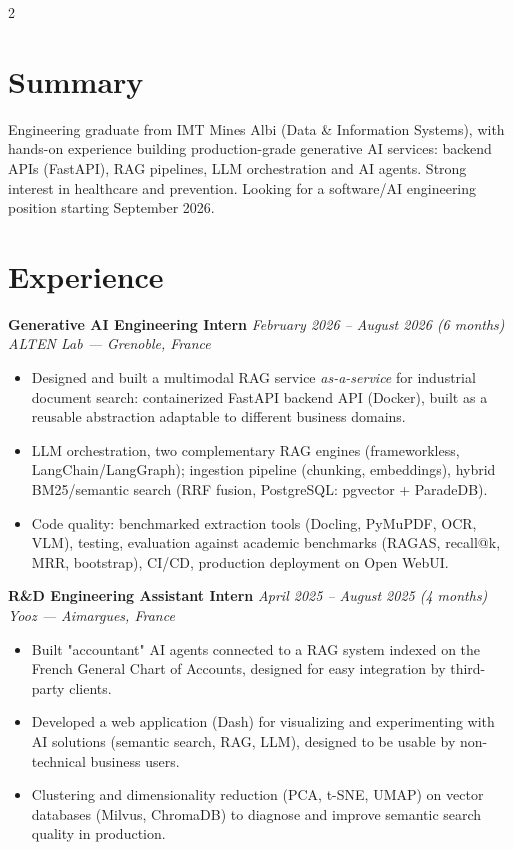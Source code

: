 \documentclass[10.5pt,a4paper]{article}
\newcommand{\sectionrule}{\vspace{-6pt}{\color{accent}\hrule height 1pt}\vspace{3pt}}
\newcommand{\cvexp}[5]{%
  \noindent\textbf{#1} \hfill {\itshape\color{graytext}\small #4}\\
  {\itshape #2 --- #3}\\[-6pt]
  #5
  \vspace{9pt}
}
\begin{document}
\setlength{\columnsep}{1.5em}
\begin{paracol}{2}

\section*{Summary}
\sectionrule
\justifying
Engineering graduate from IMT Mines Albi (Data \& Information Systems), with hands-on experience building production-grade generative AI services: backend APIs (FastAPI), RAG pipelines, LLM orchestration and AI agents. Strong interest in healthcare and prevention. Looking for a software/AI engineering position starting September 2026.

\section*{Experience}
\sectionrule

\cvexp{Generative AI Engineering Intern}{ALTEN Lab}{Grenoble, France}{February 2026 -- August 2026 (6 months)}{%
  \begin{itemize}[leftmargin=12pt, itemsep=2pt, topsep=0pt, partopsep=0pt, parsep=0pt]
    \item Designed and built a multimodal RAG service \emph{as-a-service} for industrial document search: containerized FastAPI backend API (Docker), built as a reusable abstraction adaptable to different business domains.
    \item LLM orchestration, two complementary RAG engines (frameworkless, LangChain/\allowbreak LangGraph); ingestion pipeline (chunking, embeddings), hybrid BM25/\allowbreak semantic search (RRF fusion, PostgreSQL: pgvector + ParadeDB).
    \item Code quality: benchmarked extraction tools (Docling, PyMuPDF, OCR, VLM), testing, evaluation against academic benchmarks (RAGAS, recall@k, MRR, bootstrap), CI/CD, production deployment on Open WebUI.
  \end{itemize}
}

\cvexp{R\&D Engineering Assistant Intern}{Yooz}{Aimargues, France}{April 2025 -- August 2025 (4 months)}{%
  \begin{itemize}[leftmargin=12pt, itemsep=2pt, topsep=0pt, partopsep=0pt, parsep=0pt]
    \item Built "accountant" AI agents connected to a RAG system indexed on the French General Chart of Accounts, designed for easy integration by third-party clients.
    \item Developed a web application (Dash) for visualizing and experimenting with AI solutions (semantic search, RAG, LLM), designed to be usable by non-technical business users.
    \item Clustering and dimensionality reduction (PCA, t-SNE, UMAP) on vector databases (Milvus, ChromaDB) to diagnose and improve semantic search quality in production.
  \end{itemize}
}


\end{paracol}
\end{document}
